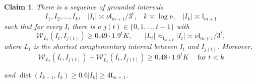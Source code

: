 \documentclass{amsart}
\renewcommand{\sp}{{\ \ }}
\newcommand{\1}{{\mathbb 1 }}
\newcommand{\Width}{{\mathcal W}}
\newcommand{\length}{{\mathfrak l}}
\newtheorem{claim5}{Claim}
\theoremstyle{remark}
\numberwithin{equation}{section}
\theoremstyle{definition}
\newcommand{\dist}{\operatorname{dist}}
\begin{document}
\begin{claim5}
\label{cl5:I_n}
There is a sequence of grounded intervals \[I_1,I_2,\dots, I_{k},\sp\sp |I_t|\asymp \nu \length_{m+1}/3^t, \sp\sp k\asymp \log \nu, \sp\sp |I_k|\asymp \length _{m+1} \]
such that for every $I_t$ there is a $j(t)\in \{0,1,\dots, t-1\}$ with \[ \Width _{L_t}(I_t, I_{j(t)})\ge  0.49 \cdot 1.9^{t} K,\sp\sp\sp\sp
|L_t| \approx_{\length_{m+1}} |I_t|\asymp \nu \length_{m+1}/3^t,\]
where $L_t$ is the shortest complementary interval between $I_t$ and $I_{j(t)}$. Moreover,
\begin{equation}
\label{eq:cl5:I_n}
\Width _{L_t}(I_t, I_{j(t)}) - \Width^+ _{L_t}(I_t, I_{j(t)})  \ge  0.48 \cdot 1.9^{t} K \sp\sp\text{ for }t<k
\end{equation} 

and $\dist(I_{k-1}, I_k)\ge 0.6 | I_k|\ge 4\length_{m+1}$.

 \end{claim5}
\end{document}
